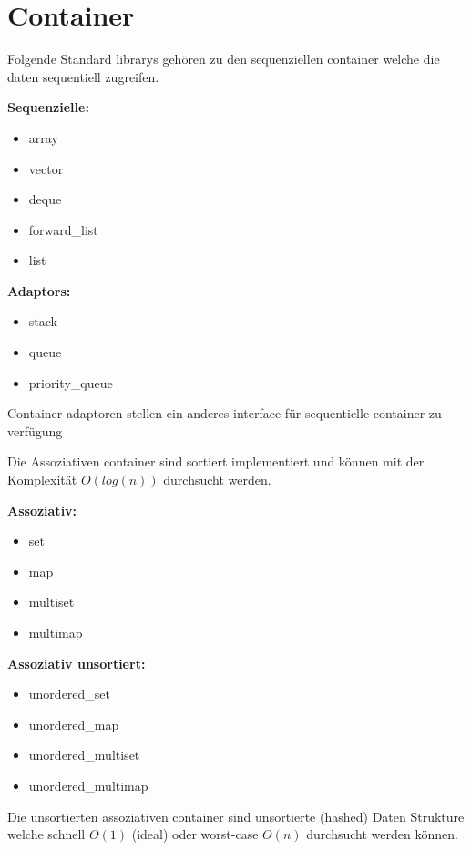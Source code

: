 \section{Container}
Folgende Standard librarys gehören zu den sequenziellen container welche die daten sequentiell zugreifen.

\begin{multicols}{2}
	\textbf{Sequenzielle:}
	\begin{itemize}
		\item array
		\item vector
		\item deque
		\item forward\_list
		\item list
	\end{itemize}
	
	\textbf{Adaptors:}
	\begin{itemize}
		\item stack
		\item queue
		\item priority\_queue
	\end{itemize}
	
\end{multicols}
Container adaptoren stellen ein anderes interface für sequentielle container zu verfügung


Die Assoziativen container sind sortiert implementiert und können mit der Komplexität $O(log(n))$ durchsucht werden.
\begin{multicols}{2}
	\textbf{Assoziativ:}
\begin{itemize}
	\item set
	\item map
	\item multiset
	\item multimap
\end{itemize}

\textbf{Assoziativ unsortiert:}
\begin{itemize}
	\item unordered\_set
	\item unordered\_map
	\item unordered\_multiset
	\item unordered\_multimap
\end{itemize}
\end{multicols}
Die unsortierten assoziativen container sind unsortierte (hashed) Daten Strukture welche schnell $O(1)$ (ideal) oder worst-case $O(n)$ durchsucht werden können.
